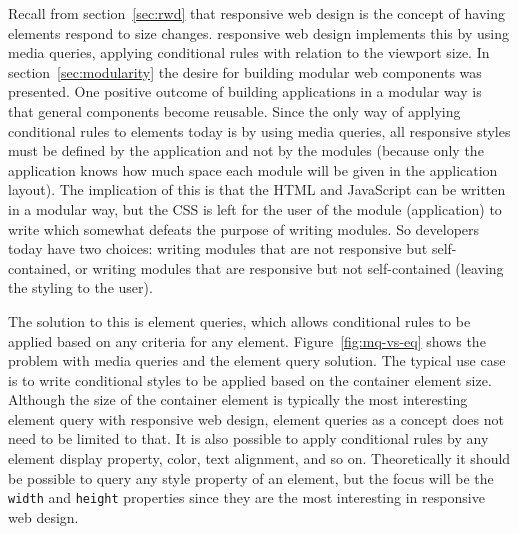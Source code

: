 \documentclass[a4paper,11pt]{kth-mag}
\newcommand{\code}[1]{\texttt{#1}}
\begin{document}

      Recall from section~\ref{sec:rwd} that \gls{responsive} \gls{web} design is the concept of having \glspl{element} respond to size changes.
      \Gls{responsive} \gls{web} design implements this by using \gls{media queries}, applying conditional rules with relation to the \gls{viewport} size.
      In section~\ref{sec:modularity} the desire for building modular \gls{web} components was presented.
      One positive outcome of building applications in a modular way is that general components become reusable.
      Since the only way of applying conditional rules to \glspl{element} today is by using \gls{media queries}, all \gls{responsive} styles must be defined by the application and not by the modules (because only the application knows how much space each module will be given in the application layout).
      The implication of this is that the \gls{HTML} and \gls{JavaScript} can be written in a modular way, but the \gls{CSS} is left for the user of the module (application) to write which somewhat defeats the purpose of writing modules.
      So developers today have two choices: writing modules that are not \gls{responsive} but \gls{self-contained}, or writing modules that are \gls{responsive} but not \gls{self-contained} (leaving the styling to the user).

      The solution to this is element queries, which allows conditional rules to be applied based on any criteria for any \gls{element}.
      Figure~\ref{fig:mq-vs-eq} shows the problem with \gls{media queries} and the element query solution.
      The typical use case is to write conditional styles to be applied based on the container \gls{element} size.
      Although the size of the container \gls{element} is typically the most interesting element query with \gls{responsive} \gls{web} design, element queries as a concept does not need to be limited to that.
      It is also possible to apply conditional rules by any \gls{element} display property, color, text alignment, and so on.
      Theoretically it should be possible to query any style property of an \gls{element}, but the focus will be the \code{width} and \code{height} properties since they are the most interesting in \gls{responsive} \gls{web} design.
\end{document}

